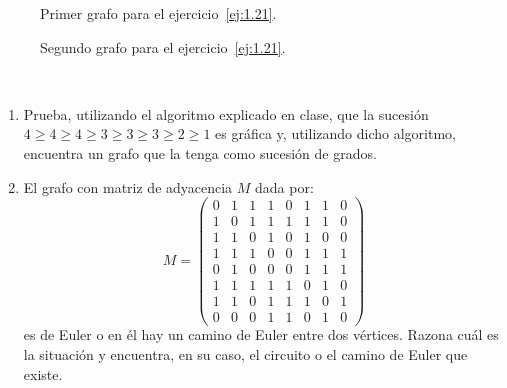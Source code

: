 \begin{ejercicio}
\begin{figure}
        
        \caption{Primer grafo para el ejercicio~\ref{ej:1.21}.}
        \label{fig:1.21_1}
    \end{figure}




    \begin{figure}
        \centering
        
        
        \caption{Segundo grafo para el ejercicio~\ref{ej:1.21}.}
        \label{fig:1.21_2}
    \end{figure}
\end{ejercicio}

\begin{ejercicio}\label{ej:1.22}~
    \begin{enumerate}
        \item Prueba, utilizando el algoritmo explicado en clase, que la sucesión $4 \geq 4 \geq 4 \geq 3 \geq 3 \geq 3 \geq 2 \geq 1$ es gráfica y, utilizando dicho algoritmo, encuentra un grafo que la tenga como sucesión de grados.
        
        \item El grafo con matriz de adyacencia $M$ dada por:
        \[
            M=\begin{pmatrix}
                0 & 1 & 1 & 1 & 0 & 1 & 1 & 0 \\
                1 & 0 & 1 & 1 & 1 & 1 & 1 & 0 \\
                1 & 1 & 0 & 1 & 0 & 1 & 0 & 0 \\
                1 & 1 & 1 & 0 & 0 & 1 & 1 & 1 \\
                0 & 1 & 0 & 0 & 0 & 1 & 1 & 1 \\
                1 & 1 & 1 & 1 & 1 & 0 & 1 & 0 \\
                1 & 1 & 0 & 1 & 1 & 1 & 0 & 1 \\
                0 & 0 & 0 & 1 & 1 & 0 & 1 & 0
            \end{pmatrix}
        \]
        es de Euler o en él hay un camino de Euler entre dos vértices. Razona cuál es la situación y encuentra, en su caso, el circuito o el camino de Euler que existe.
    \end{enumerate}
\end{ejercicio}

